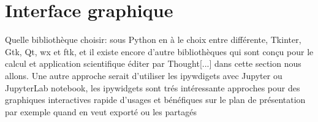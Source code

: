 \documentclass[11pt,fleqn]{book} %
\begin{document}


\section{Interface graphique}
Quelle bibliothèque choisir: sous Python en \`a le choix entre diff\'erente, Tkinter, Gtk, 
Qt, wx et ftk, et il existe encore d'autre bibliothèques qui sont con\c{c}u pour le calcul 
et application scientifique \'editer par Thought[...] dans cette section nous allons. Une 
autre approche serait d'utiliser les ipywdigets avec Jupyter ou JupyterLab notebook, les 
ipywidgets sont trés intéressante approches pour des graphiques interactives rapide d'usages
et bénéfiques sur le plan de présentation par exemple quand en veut exporté ou les partagés 


\end{document}
